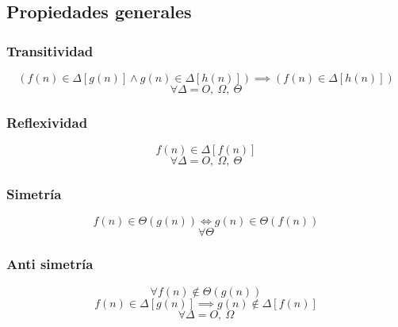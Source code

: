 \documentclass[tikz,11pt,fleqn]{book} %
\begin{document}

\subsection{Propiedades generales}
\subsubsection{Transitividad}
$$
	(f(n)\in\Delta[g(n)] \land g(n)\in\Delta[h(n)])
	\implies
	(f(n)\in\Delta[h(n)]) $$ $$
	\forall\Delta=O,~\Omega,~\Theta
$$
\subsubsection{Reflexividad}
$$
	f(n)\in\Delta[f(n)] $$ $$
	\forall\Delta=O,~\Omega,~\Theta
$$
\subsubsection{Simetría}
$$
	f(n)\in\Theta(g(n))
	\iff
	g(n)\in\Theta(f(n))
$$ $$
	\forall\Theta
$$
\subsubsection{Anti simetría}
$$
	\forall f(n)\not\in \Theta(g(n))
$$ $$
	f(n)\in\Delta[g(n)]
	\implies
	g(n)\not\in\Delta[f(n)] $$ $$
	\forall\Delta= O,~\Omega
$$
\end{document}
